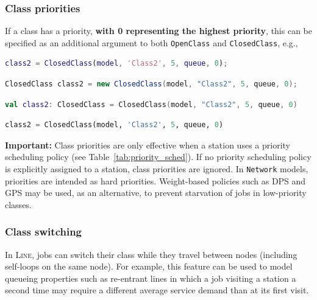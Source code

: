 \subsubsection{Class priorities}
If a class has a priority, \textbf{with 0 representing the highest priority}, this can be specified as an additional argument to both \texttt{OpenClass} and \texttt{ClosedClass}, e.g.,
\begin{MATLAB}
\begin{lstlisting}[language = matlab]
class2 = ClosedClass(model, 'Class2', 5, queue, 0);
\end{lstlisting}
\end{MATLAB}
\begin{JAVA}
\begin{lstlisting}[language = java, basicstyle=\ttfamily\scriptsize]
ClosedClass class2 = new ClosedClass(model, "Class2", 5, queue, 0);
\end{lstlisting}
\end{JAVA}
\begin{KOTLIN}
\begin{lstlisting}[language = kotlin, basicstyle=\ttfamily\scriptsize]
val class2: ClosedClass = ClosedClass(model, "Class2", 5, queue, 0)
\end{lstlisting}
\end{KOTLIN}
\begin{PYTHON}
\begin{lstlisting}[language = python]
class2 = ClosedClass(model, 'Class2', 5, queue, 0)
\end{lstlisting}
\end{PYTHON}
\textbf{Important:} Class priorities are only effective when a station uses a priority scheduling policy (see Table~\ref{tab:priority_sched}). If no priority scheduling policy is explicitly assigned to a station, class priorities are ignored. In \texttt{Network} models, priorities are intended as hard priorities. Weight-based policies such as DPS and GPS may be used, as an alternative, to prevent starvation of jobs in low-priority classes.

\subsubsection{Class switching}
In \textsc{Line}, jobs can switch their class while they travel between nodes (including self-loops on the same node). For example, this feature can be used to model queueing properties such as re-entrant lines in which a job visiting a station a second time may require a different average service demand than at its first visit.

